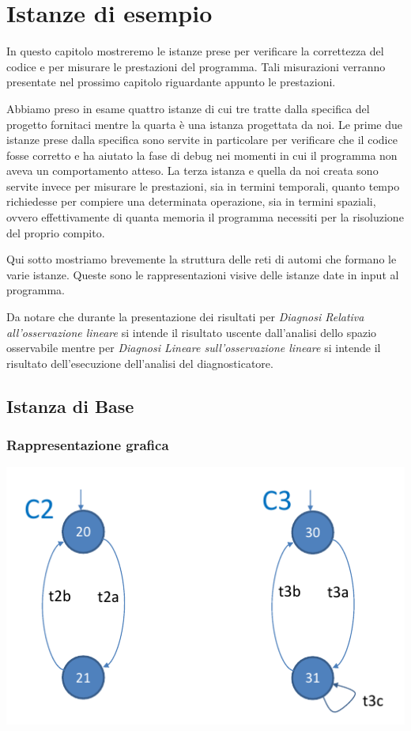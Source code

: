 \section{Istanze di esempio}
In questo capitolo mostreremo le istanze prese per verificare la correttezza del codice e per misurare le prestazioni del programma. Tali misurazioni verranno presentate nel prossimo capitolo riguardante appunto le prestazioni.

Abbiamo preso in esame quattro istanze di cui tre tratte dalla specifica del progetto fornitaci mentre la quarta è una istanza progettata da noi. Le prime due istanze prese dalla specifica sono servite in particolare per verificare che il codice fosse corretto e ha aiutato la fase di debug nei momenti in cui il programma non aveva un comportamento atteso. La terza istanza e quella da noi creata sono servite invece per misurare le prestazioni, sia in termini temporali, quanto tempo richiedesse per compiere una determinata operazione, sia in termini spaziali, ovvero effettivamente di quanta memoria il programma necessiti per la risoluzione del proprio compito.

Qui sotto mostriamo brevemente la struttura delle reti di automi che formano le varie istanze. Queste sono le rappresentazioni visive delle istanze date in input al programma.

Da notare che durante la presentazione dei risultati per \textit{Diagnosi Relativa all’osservazione lineare} si intende il risultato uscente dall'analisi dello spazio osservabile mentre per \textit{Diagnosi Lineare sull’osservazione lineare} si intende il risultato dell'esecuzione dell'analisi del diagnosticatore.

\subsection{Istanza di Base}
\subsubsection{Rappresentazione grafica}
\includegraphics[width=\textwidth]{immagini/B1Rete.png}

